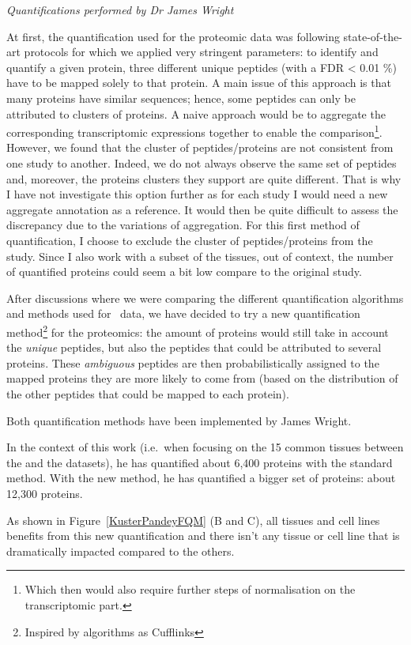 \textit{Quantifications performed by Dr James Wright}

At first, the quantification used for the proteomic data was following
state-of-the-art protocols for which we applied very stringent parameters:
to identify and quantify a given protein, three different unique peptides
(with a \gls{FDR} < 0.01 \%) have to be mapped solely to that protein. A main
issue of this approach is that many proteins have similar sequences; hence, some
peptides can only be attributed to clusters of proteins. A naive approach would
be to aggregate the corresponding transcriptomic expressions together to enable
the comparison\footnote{Which then would also require further steps of
normalisation on the transcriptomic part.}. However, we found that the cluster
of peptides/proteins are not consistent from one study to another. Indeed, we do
not always observe the same set of peptides and, moreover, the proteins clusters
they support are quite different. That is why I have not investigate this option
further as for each study I would need a new aggregate annotation as a reference.
It would then be quite difficult to assess the discrepancy due to the
variations of aggregation. For this first method of quantification, I choose to exclude
the cluster of peptides/proteins from the study. Since I also work with a subset
of the tissues, out of context, the number of quantified proteins could seem a bit
low compare to the original study.

After discussions where we were comparing the different quantification algorithms
and methods used for \Rnaseq\ data, we have decided to try a new quantification
method\footnote{Inspired by algorithms as Cufflinks} for the proteomics:
the amount of proteins would still take in account the \emph{unique} peptides,
but also the peptides that could be attributed to several proteins.
These \emph{ambiguous} peptides are then probabilistically assigned to the
mapped proteins they are more likely to come from (based on the distribution of
the other peptides that could be mapped to each protein).

Both quantification methods have been implemented by James Wright.

In the context of this work (i.e.\ when focusing on the 15 common tissues between
the  and the  datasets),
he has quantified about 6,400 proteins with
the standard method. With the new method, he has quantified a bigger set of
proteins: about 12,300 proteins.

As shown in Figure~\ref{KusterPandeyFQM} (B and C),
all tissues and cell lines benefits from this new quantification and there isn't
any tissue or cell line that is dramatically impacted compared to the others.

